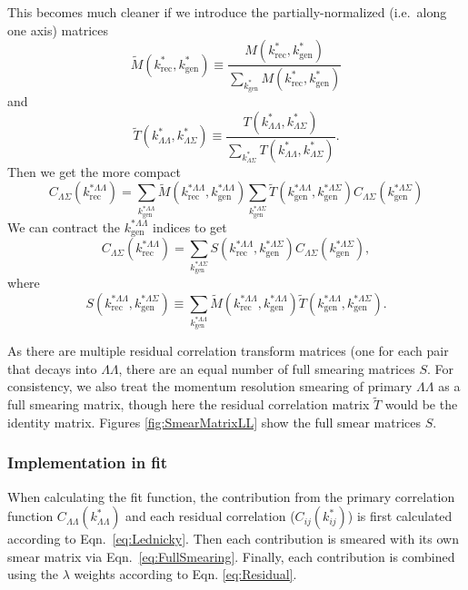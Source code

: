 This becomes much cleaner if we introduce the partially-normalized (i.e.\ along one axis) matrices
\begin{equation}
\tilde{M}(k^*_{\mathrm{rec}},k^*_{\mathrm{gen}}) \equiv \frac{M(k^*_{\mathrm{rec}},k^*_{\mathrm{gen}})}{\displaystyle\sum\limits_{k^*_{\mathrm{gen}}}M(k^*_{\mathrm{rec}},k^*_{\mathrm{gen}})}
\end{equation}
and
\begin{equation}
\tilde{T}(k^*_{\Lambda\Lambda},k^*_{\Lambda\Sigma}) \equiv \frac{T(k^*_{\Lambda\Lambda},k^*_{\Lambda\Sigma})}{\displaystyle\sum\limits_{k^*_{\Lambda\Sigma}}T(k^*_{\Lambda\Lambda},k^*_{\Lambda\Sigma})}.
\end{equation}
Then we get the more compact
\begin{equation}
C_{\Lambda\Sigma}(k^{*\Lambda\Lambda}_{\mathrm{rec}}) = \displaystyle\sum\limits_{k^{*\Lambda\Lambda}_{\mathrm{gen}}}\tilde{M}(k^{*\Lambda\Lambda}_{\mathrm{rec}},k^{*\Lambda\Lambda}_{\mathrm{gen}})\displaystyle\sum\limits_{k^{*\Lambda\Sigma}_{\mathrm{gen}}}\tilde{T}(k^{*\Lambda\Lambda}_\mathrm{gen},k^{*\Lambda\Sigma}_{\mathrm{gen}})C_{\Lambda\Sigma}(k^{*\Lambda\Sigma}_{\mathrm{gen}})
\end{equation}
We can contract the $k^{*\Lambda\Lambda}_\mathrm{gen}$ indices to get
\begin{equation}
\label{eq:FullSmearing}
C_{\Lambda\Sigma}(k^{*\Lambda\Lambda}_{\mathrm{rec}}) = \displaystyle\sum\limits_{k^{*\Lambda\Sigma}_{\mathrm{gen}}}S(k^{*\Lambda\Lambda}_{\mathrm{rec}},k^{*\Lambda\Sigma}_{\mathrm{gen}})C_{\Lambda\Sigma}(k^{*\Lambda\Sigma}_{\mathrm{gen}}),
\end{equation}
where 
\begin{equation}
S(k^{*\Lambda\Lambda}_{\mathrm{rec}},k^{*\Lambda\Sigma}_{\mathrm{gen}}) \equiv \displaystyle\sum\limits_{k^{*\Lambda\Lambda}_{\mathrm{gen}}}\tilde{M}(k^{*\Lambda\Lambda}_{\mathrm{rec}},k^{*\Lambda\Lambda}_{\mathrm{gen}})\tilde{T}(k^{*\Lambda\Lambda}_\mathrm{gen},k^{*\Lambda\Sigma}_{\mathrm{gen}}).
\end{equation}

As there are multiple residual correlation transform matrices (one for each pair that decays into $\Lambda\Lambda$, there are an equal number of full smearing matrices $S$.
For consistency, we also treat the momentum resolution smearing of primary $\Lambda\Lambda$ as a full smearing matrix, though here the residual correlation matrix $\tilde{T}$ would be the identity matrix. 
Figures \ref{fig:SmearMatrixLL} show the full smear matrices $S$.

\subsubsection{Implementation in fit}

When calculating the fit function, the contribution from the primary correlation function $C_{\Lambda\Lambda}(k^*_{\Lambda\Lambda})$ and each residual correlation  ($C_{ij}(k^*_{ij})$) is first calculated according to Eqn.\ \ref{eq:Lednicky}.
Then each contribution is smeared with its own smear matrix via Eqn.\ \ref{eq:FullSmearing}.
Finally, each contribution is combined using the $\lambda$ weights according to Eqn. \ref{eq:Residual}.

 